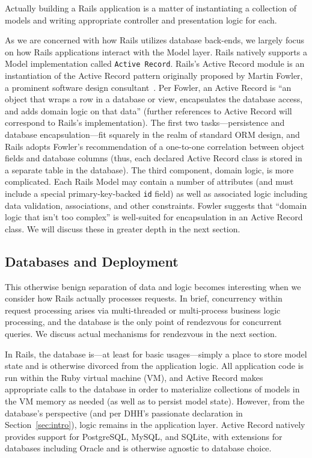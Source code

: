 Actually building a Rails application is a matter of instantiating a collection of models and writing appropriate controller and presentation logic for each.

As we are concerned with how Rails utilizes database back-ends, we largely focus on how Rails applications interact with the Model layer. Rails natively supports a Model implementation called \texttt{Active Record}. Rails's Active Record module is an instantiation of the Active Record pattern originally proposed by Martin Fowler, a prominent software design consultant~\cite{fowler-book}. Per Fowler, an Active Record is ``an object that wraps a row in a database or view, encapsulates the database access, and adds domain logic on that data'' (further references to Active Record will correspond to Rails's implementation). The first two tasks---persistence and database encapsulation---fit squarely in the realm of standard ORM design, and Rails adopts Fowler's recommendation of a one-to-one correlation between object fields and database columns (thus, each declared Active Record class is stored in a separate table in the database). The third component, domain logic, is more complicated. Each Rails Model may contain a number of attributes (and must include a special primary-key-backed \texttt{id} field) as well as associated logic including data validation, associations, and other constraints. Fowler suggests that ``domain logic that isn't too complex'' is well-suited for encapsulation in an Active Record class. We will discuss these in greater depth in the next section.

\subsection{Databases and Deployment}
\label{sec:deployment}

This otherwise benign separation of data and logic becomes interesting when we consider how Rails actually processes requests. In brief, concurrency within request processing arises via multi-threaded or multi-process business logic processing, and the database is the only point of rendezvous for concurrent queries. We discuss actual mechanisms for rendezvous in the next section.

In Rails, the database is---at least for basic usages---simply a place to store model state and is otherwise divorced from the application logic. All application code is run within the Ruby virtual machine (VM), and Active Record makes appropriate calls to the database in order to materialize collections of models in the VM memory as needed (as well as to persist model state). However, from the database's perspective (and per DHH's passionate declaration in Section~\ref{sec:intro}), logic remains in the application layer. Active Record natively provides support for PostgreSQL, MySQL, and SQLite, with extensions for databases including Oracle and is otherwise agnostic to database choice.

